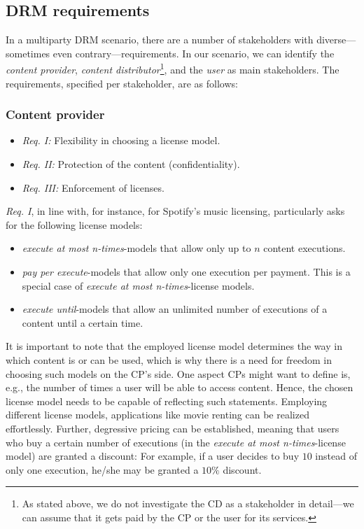 \documentclass{llncs}
\begin{document}
\subsection{DRM requirements} \label{requirements}

In a multiparty DRM scenario, there are a number of stakeholders with diverse---sometimes even contrary---requirements. In our scenario, we can identify the \emph{content provider}, \emph{content distributor}\footnote{As stated above, we do not investigate the CD as a stakeholder in detail---we can assume that it gets paid by the CP or the user for its services.}, and the \emph{user} as main stakeholders. The requirements, specified per stakeholder, are as follows:

\subsubsection{Content provider}

\begin{itemize}
\item \emph{Req. I:} Flexibility in choosing a license model.
\item \emph{Req. II:} Protection of the content (confidentiality). 
\item \emph{Req. III:} Enforcement of licenses.
\end{itemize}

\emph{Req. I}, in line with, for instance, \cite{music-licensing} for Spotify's music licensing, particularly asks for the following license models: 
\begin{itemize}
\item \emph{execute at most n-times}-models that allow only up to $n$ content executions.
\item \emph{pay per execute}-models that allow only one execution per payment. This is a special case of \emph{execute at most n-times}-license models.
\item \emph{execute until}-models that allow an unlimited number of executions of a content until a certain time.
\end{itemize}

It is important to note that the employed license model determines the way in which content is or can be used, which is why there is a need for freedom in choosing such models on the CP's side. One aspect CPs might want to define is, e.g., the number of times a user will be able to access content. Hence, the chosen license model needs to be capable of reflecting such statements. Employing different license models, applications like movie renting can be realized effortlessly. Further, degressive pricing can be established, meaning that users who buy a certain number of executions (in the \emph{execute at most n-times}-license model) are granted a discount: For example, if a user decides to buy $10$ instead of only one execution, he/she may be granted a $10 \%$ discount.
\end{document}
